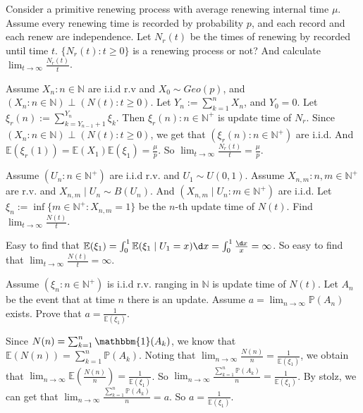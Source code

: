 \documentclass{ctexart}
\begin{document}
\begin{problem}\label{pro:2}
  Consider a primitive renewing process with average renewing internal time \(\mu\). Assume every renewing time
  is recorded by probability \(p\), and each record and each renew are independence. Let \(N_r(t)\) be the
  times of renewing by recorded until time \(t\). \(\{N_r(t): t \geq 0\}\) is a renewing process or not?
  And calculate \(\lim_{t \to \infty}\frac{N_r(t)}{t}\).
\end{problem}
\begin{solution}
  Assume \(X_n:n \in \mathbb{N}\) are i.i.d r.v and \(X_0 \sim Geo(p)\), and \((X_n:n \in \mathbb{N})\perp (N(t):t \geq 0)\).
  Let \(Y_n:=\sum_{k=1}^{n} X_n\), and \(Y_0=0\).
  Let \(\xi_r(n):=\sum_{k=Y_{n-1}+1}^{Y_{n}} \xi_k\).
  Then \(\xi_r(n):n \in \mathbb{N}^+\) is update time of \(N_r\).
  Since \((X_n:n \in \mathbb{N})\perp (N(t):t \geq 0)\), we get that \((\xi_r(n):n \in \mathbb{N}^+)\) are i.i.d.
  And \(\mathbb{E}(\xi_r(1))=\mathbb{E}(X_1)\mathbb{E}(\xi_1)=\frac{\mu}{p}\).
  So \(\lim_{t \to \infty}\frac{N_r(t)}{t}=\frac{\mu}{p}\).
\end{solution}
\begin{problem}\label{pro:3}
  Assume \((U_n:n \in \mathbb{N}^+)\) are i.i.d r.v. and \(U_1 \sim U(0,1)\).
  Assume \(X_{n,m}:n,m \in \mathbb{N}^+\) are r.v. and \(X_{n,m} \mid U_n \sim B(U_n)\).
  And \((X_{n,m} \mid U_n:m \in \mathbb{N}^+)\) are i.i.d.
  Let \(\xi_n:=\inf \{m \in \mathbb{N}^+:X_{n,m}=1\}\) be the \(n\)-th update time of \(N(t)\).
  Find \(\lim_{t \to \infty}\frac{N(t)}{t}\).
\end{problem}
\begin{solution}
  Easy to find that \(\mathbb{E}(\xi_1)=\int_{0}^{1} \mathbb{E}(\xi_1 \mid U_1=x) \d x=\int_{0}^{1} \frac{\d x}{x}=\infty\).
  So easy to find that \(\lim_{t \to \infty}\frac{N(t)}{t}=\infty\).
\end{solution}
\begin{problem}\label{pro:4}
  Assume \((\xi_n:n \in \mathbb{N}^+)\) is i.i.d r.v. ranging in \(\mathbb{N}\) is update time of \(N(t)\).
  Let \(A_n\) be the event that at time \(n\) there is an update.
  Assume \(a=\lim_{n \to \infty}\mathbb{P}(A_n)\) exists.
  Prove that \(a=\frac{1}{\mathbb{E}(\xi_1)}\).
\end{problem}
\begin{solution}
  Since \(N(n)=\sum_{k=1}^{n} \mathbbm{1}(A_k)\), we know that \(\mathbb{E}(N(n))=\sum_{k=1}^{n} \mathbb{P}(A_k)\).
  Noting that \(\lim_{n \to \infty}\frac{N(n)}{n}=\frac{1}{\mathbb{E}(\xi_1)}\), we obtain that \(\lim_{n \to \infty}\mathbb{E}(\frac{N(n)}{n})=\frac{1}{\mathbb{E}(\xi_1)}\).
  So \(\lim_{n \to \infty}\frac{\sum_{k=1}^{n} \mathbb{P}(A_k)}{n}=\frac{1}{\mathbb{E}(\xi_1)}\).
  By stolz, we can get that \(\lim_{n \to \infty}\frac{\sum_{k=1}^{n} \mathbb{P}(A_k)}{n}=a\).
  So \(a=\frac{1}{\mathbb{E}(\xi_1)}\).
\end{solution}
\end{document}
